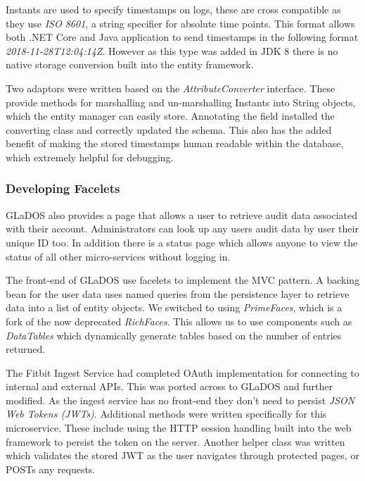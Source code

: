 \par
Instants are used to specify timestamps on logs, these are cross compatible as they use \textit{ISO 8601}\cite{ISO_8601}, a string specifier for absolute time points. This format allows both .NET Core and Java application to send timestamps in the following format \textit{2018-11-28T12:04:14Z}. However as this type was added in JDK 8 there is no native storage conversion built into the entity framework.

\par
Two adaptors were written based on the \textit{AttributeConverter} interface. These provide methods for marshalling and un-marshalling Instants into String objects, which the entity manager can easily store. Annotating the field installed the converting class and correctly updated the schema. This also has the added benefit of making the stored timestamps human readable within the database, which extremely helpful for debugging.

\subsubsection{Developing Facelets}
\par
GLaDOS also provides a page that allows a user to retrieve audit data associated with their account. Administrators can look up any users audit data by user their unique ID too. In addition there is a status page which allows anyone to view the status of all other micro-services without logging in.

\par
The front-end of GLaDOS use facelets to implement the MVC pattern. A backing bean for the user data uses named queries from the persistence layer to retrieve data into a list of entity objects. We switched to using \textit{PrimeFaces}\cite{Primefaces}, which is a fork of the now deprecated \textit{RichFaces}. This allows us to use components such as \textit{DataTables} which dynamically generate tables based on the number of entries returned.

\par
The Fitbit Ingest Service had completed OAuth implementation for connecting to internal and external APIs. This was ported across to GLaDOS and further modified. As the ingest service has no front-end they don't need to persist \textit{JSON Web Tokens (JWTs)}. Additional methods were written specifically for this microservice. These include using the HTTP session handling built into the web framework to persist the token on the server. Another helper class was written which validates the stored JWT as the user navigates through protected pages, or POSTs any requests.


